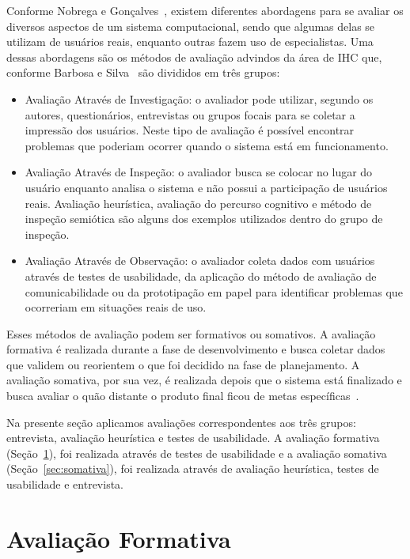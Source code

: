 Conforme Nobrega e Gonçalves~\cite{nobrega_metodo_2013}, existem diferentes abordagens para se avaliar os diversos aspectos de um sistema computacional, sendo que algumas delas se utilizam de usuários reais, enquanto outras fazem uso de especialistas. Uma dessas abordagens são os métodos de avaliação advindos da área de \acrfull{IHC} que, conforme Barbosa e Silva~\cite{barbosa2010interacao} são divididos em três grupos:

\begin{itemize}
	\item Avaliação Através de Investigação: o avaliador pode utilizar, segundo os autores, questionários, entrevistas ou grupos focais para se coletar a impressão dos usuários. Neste tipo de avaliação é possível encontrar problemas que poderiam ocorrer quando o sistema está em funcionamento.
	\item Avaliação Através de Inspeção: o avaliador busca se colocar no lugar do usuário enquanto analisa o sistema e não possui a participação de usuários reais. Avaliação heurística, avaliação do percurso cognitivo e método de inspeção semiótica são alguns dos exemplos utilizados dentro do grupo de inspeção.
	\item Avaliação Através de Observação: o avaliador coleta dados com usuários através de testes de usabilidade, da aplicação do método de avaliação de comunicabilidade ou da prototipação em papel para identificar problemas que ocorreriam em situações reais de uso.
\end{itemize}

Esses métodos de avaliação podem ser formativos ou somativos. A avaliação formativa é realizada durante a fase de desenvolvimento e busca coletar dados que validem ou reorientem o que foi decidido na fase de planejamento. A avaliação somativa, por sua vez, é realizada depois que o sistema está finalizado e busca avaliar o quão distante o produto final ficou de metas específicas~\cite{barbosa2010interacao}.

Na presente seção aplicamos avaliações correspondentes aos três grupos: entrevista, avaliação heurística e testes de usabilidade. A avaliação formativa (Seção~\ref{sec:formativa}), foi realizada através de testes de usabilidade e a avaliação somativa (Seção~\ref{sec:somativa}), foi realizada através de avaliação heurística, testes de usabilidade e entrevista.

\section{Avaliação Formativa} \label{sec:formativa}

